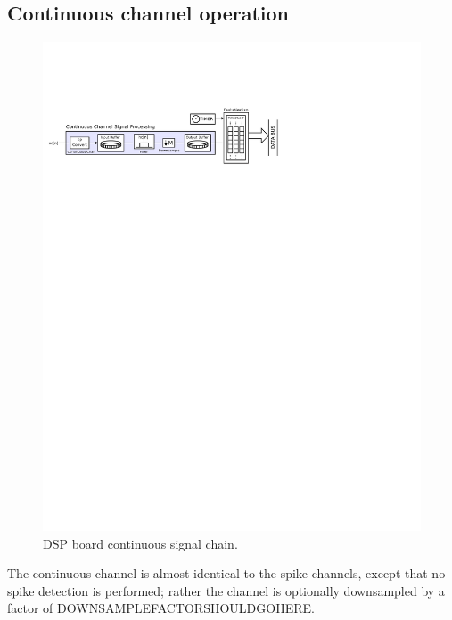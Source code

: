 \subsection{Continuous channel operation}
\begin{figure}[h!]
\begin{center}
\includegraphics[scale=1.0]{contsignal.svg}
\end{center}
\label{ConChain}
\caption{DSP board continuous signal chain.}
\end{figure}

The continuous channel is almost identical to the spike channels, except that no spike detection is performed; rather the channel is optionally downsampled by a factor of DOWNSAMPLEFACTORSHOULDGOHERE. 
